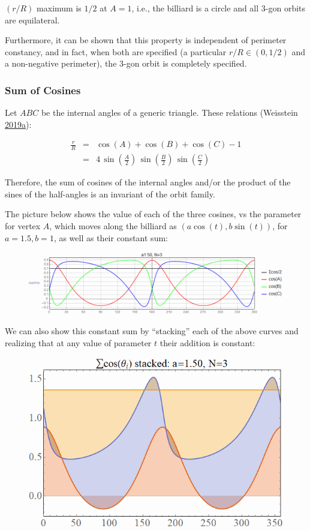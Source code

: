 \documentclass[]{article}
\begin{document}
\((r/R)\) maximum is \(1/2\) at \(A=1\), i.e., the billiard is a circle and all 3-gon orbits are equilateral.

Furthermore, it can be shown that this property is independent of perimeter constancy, and in fact, when both are specified (a particular \(r/R\in (0,1/2)\) and a non-negative perimeter), the 3-gon orbit is completely specified.

\hypertarget{sum-of-cosines}{%
\subsubsection{Sum of Cosines}\label{sum-of-cosines}}

Let \(ABC\) be the internal angles of a generic triangle. These relations (Weisstein \protect\hyperlink{ref-mw}{2019}\protect\hyperlink{ref-mw}{a}):

\[
\begin{array}{ccc}
\frac{r}{R} & = & \cos(A)+\cos(B)+\cos(C)-1 \\[10pt]
            & = & 4\,\sin(\frac{A}{2})\,\sin(\frac{B}{2})\,\sin(\frac{C}{2})
\end{array}
\]

Therefore, the sum of cosines of the internal angles and/or the product of the sines of the half-angles is an invariant of the orbit family.

The picture below shows the value of each of the three cosines, vs the parameter for vertex \(A\), which moves along the billiard as \((a\cos(t),b\sin(t))\), for \(a=1.5,b=1\), as well as their constant sum:

\begin{figure}[H]

{\centering \includegraphics[width=0.75\linewidth]{pics/cosine_sum_n3} 

}

\end{figure}

We can also show this constant sum by ``stacking'' each of the above curves and realizing that at any value of parameter \(t\) their addition is constant:

\begin{figure}[H]

{\centering \includegraphics[width=0.5\linewidth]{pics/stacked_cosine_sum_n3} 

}

\end{figure}
\end{document}
